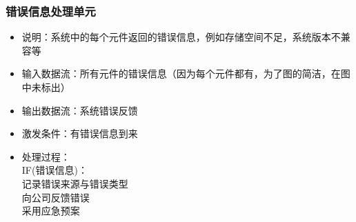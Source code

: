             \subsubsection{错误信息处理单元}
            \begin{itemize}
                \item 说明：系统中的每个元件返回的错误信息，例如存储空间不足，系统版本不兼容等
                \item 输入数据流：所有元件的错误信息（因为每个元件都有，为了图的简洁，在图中未标出）
                \item 输出数据流：系统错误反馈
                \item 激发条件：有错误信息到来
                \item 处理过程：\\
                    IF(错误信息)：\\
                        记录错误来源与错误类型\\
                        向公司反馈错误\\
                        采用应急预案\\
            \end{itemize}

